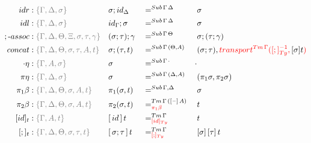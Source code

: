 \documentclass[a4paper,UKenglish,numberwithinsect,cleveref,thm-restate]{lipics-v2021}
\begin{document}
\begin{alignat*}{5}
  \mathsf{idr}    & : \implicit{\Gamma, \Delta, \sigma} && {\sigma ; \idS_{\Delta}} && =^{\Sub\,\Gamma\,\Delta} && {\sigma} \\
  \mathsf{idl}    & : \implicit{\Gamma, \Delta, \sigma} && {\idS_{\Gamma} ; \sigma} && =^{\Sub\,\Gamma\,\Delta} && {\sigma} \\
  ;\text{-}\mathsf{assoc} & : \implicit{\Gamma, \Delta, \Theta, \Xi, \sigma, \tau, \gamma} && (\sigma ; \tau) ; \gamma && =^{\Sub\,\Gamma\,\Theta} &&  \sigma ; (\tau ; \gamma) \\
  \mathsf{concat} & : \implicit{\Gamma, \Delta, \Theta, \sigma, \tau, A, t} && \sigma ; (\tau , t)      && =^{\Sub\,\Gamma\,(\Theta, A)} &&  (\sigma ; \tau) , \alert{\transfib{\Tm\,\Gamma}{[;]_{\Ty}^{-1}}{\color{black}[ \sigma ] t}} \\
  \emptyctx\eta   & : \implicit{\Gamma, A, \sigma} && \sigma                   && =^{\Sub\,\Gamma\,\emptyctx} & \emptysub \\
  \pi\eta         & : \implicit{\Gamma, \Delta, \sigma} && \sigma                   && =^{\Sub\,\Gamma\,(\Delta, A)} &&  (\pi_1 \sigma, \pi_2 \sigma) \\
  \pi_1\beta      & : \implicit{\Gamma, \Delta, \Theta, \sigma, A, t} && \pi_1(\sigma , t)        && =^{\Sub\,\Gamma,\Delta} &&  \sigma \\
  \pi_2\beta      & : \implicit{\Gamma, \Delta, \Theta, \sigma, A, t} && \pi_2(\sigma , t)        && =^{\Tm\,\Gamma\,([\blank]\,A)}_{\alert{\pi_1\beta}} &&  t \\
  [\idS]_t         & : \implicit{\Gamma, A, t} && {[\,\idS\,]\,t}          && =^{\Tm\,\Gamma}_{\alert{[\idS]_\Ty}}  && t \\
  [;]_t            & : \implicit{\Gamma, \Delta, \Theta, \sigma, \tau, t} && {[\,\sigma ; \tau\,]\,t} && =^{\Tm\,\Gamma}_{\alert{[;]_{\Ty}}}   && {[ \sigma ]\,[ \tau ]\,t} \\
\end{alignat*}
\end{document}

